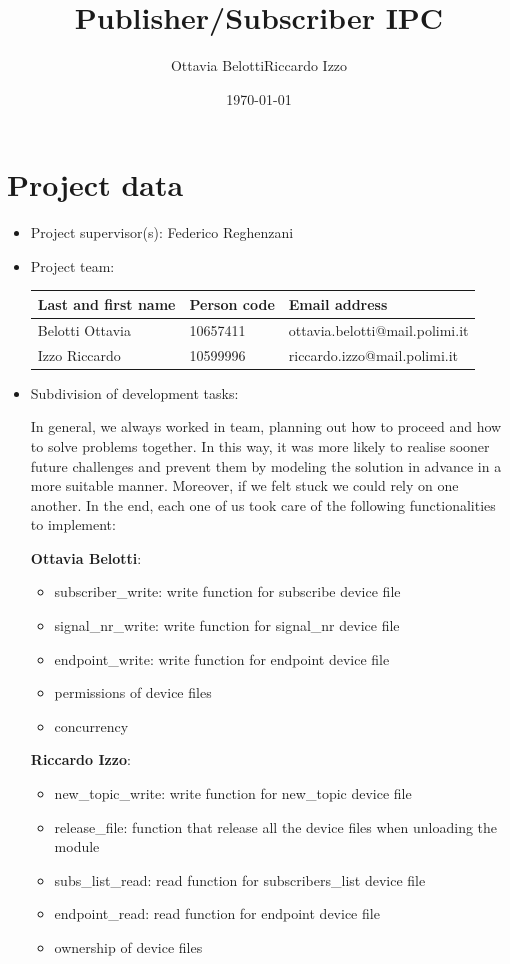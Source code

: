 \documentclass[10pt,a4]{article}
\author{Ottavia Belotti\quad Riccardo Izzo}
\date{\today}
\title{Publisher/Subscriber IPC}
\begin{document}
\maketitle
\tableofcontents

\section{Project data}

\begin{itemize}
\item 
  Project supervisor(s): Federico Reghenzani

\item 
Project team:

\begin{center}
\begin{tabular}{lll}
Last and first name & Person code & Email address\\
\hline
  Belotti Ottavia & 10657411 & ottavia.belotti@mail.polimi.it \\
  Izzo Riccardo & 10599996 & riccardo.izzo@mail.polimi.it                     
\end{tabular}
\end{center}

\item
Subdivision of development tasks:

In general, we always worked in team, planning out how to proceed and how to solve problems together. In this way, it was more likely to realise sooner future challenges and prevent them by modeling the solution in advance in a more suitable manner. Moreover, if we felt stuck we could rely on one another. In the end, each one of us took care of the following functionalities to implement:

\textbf{Ottavia Belotti}:
\begin{itemize}
  \item subscriber\_write: write function for subscribe device file
  \item signal\_nr\_write: write function for signal\_nr device file
  \item endpoint\_write: write function for endpoint device file
  \item permissions of device files
  \item concurrency
\end{itemize}

\textbf{Riccardo Izzo}:
\begin{itemize}
  \item new\_topic\_write: write function for new\_topic device file
  \item release\_file: function that release all the device files when unloading the module
  \item subs\_list\_read: read function for subscribers\_list device file
  \item endpoint\_read: read function for endpoint device file
  \item ownership of device files
\end{itemize}


\end{itemize}
\end{document}
